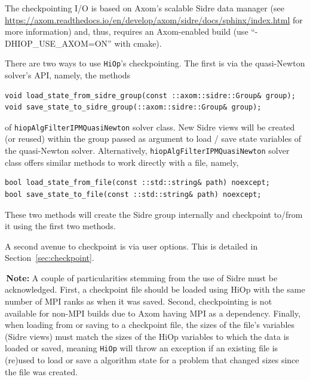 \documentclass[11pt]{article}
\newcommand{\warningSymbol}{\raisebox{0.9\depth}{\danger}}
\newcommand{\warningcp}[1]{%
        \smallskip \noindent \textcolor{warningColorText}{\warningSymbol{}}\,\textbf{#1} %
    }
\newcommand{\Hi}{\texttt{HiOp}\xspace}
\begin{document}
The checkpointing I/O is based on Axom's scalable Sidre data manager (see \url{https://axom.readthedocs.io/en/develop/axom/sidre/docs/sphinx/index.html} for more information) and, thus, requires an Axom-enabled build (use ``-DHIOP\_USE\_AXOM=ON'' with cmake).

There are two ways to use \Hi's checkpointing. The first is via the quasi-Newton solver's API, namely, the methods
\begin{lstlisting} 
void load_state_from_sidre_group(const ::axom::sidre::Group& group);
void save_state_to_sidre_group(::axom::sidre::Group& group);
\end{lstlisting}
of \texttt{hiopAlgFilterIPMQuasiNewton} solver class. New Sidre views will be created (or reused) within the group passed as argument to load / save state variables of the quasi-Newton solver. Alternatively, \texttt{hiopAlgFilterIPMQuasiNewton} solver class offers similar methods to work directly with a file, namely,
\begin{lstlisting} 
bool load_state_from_file(const ::std::string& path) noexcept;
bool save_state_to_file(const ::std::string& path) noexcept;
\end{lstlisting}
These two methods will create the Sidre group internally and checkpoint to/from it using the first two methods.

A second avenue to checkpoint is via user options. This is detailed in Section~\ref{sec:checkpoint}.

 \warningcp{Note:} A couple of particularities stemming from the use of Sidre must be acknowledged. First, a checkpoint file should be loaded using HiOp with the same number of MPI ranks as when it was saved. Second, checkpointing is not available for non-MPI builds due to Axom having MPI as a dependency. Finally, when loading from or saving to a checkpoint file, the sizes of the file's variables (Sidre views) must match the sizes of the HiOp variables to which the data is loaded or saved, meaning \Hi will throw an exception if an existing file is (re)used to load or save a algorithm state for a problem that changed sizes since the file was created.



\end{document}
